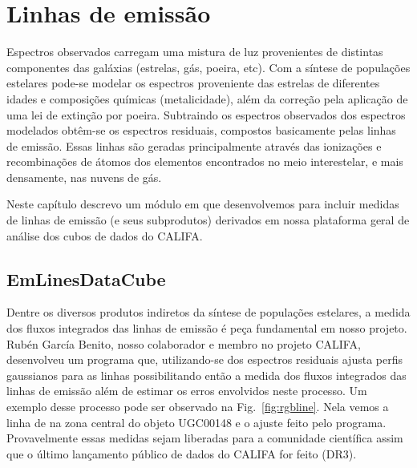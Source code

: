 


\chapter{Linhas de emissão}
\label{sec:emlines}

Espectros observados carregam uma mistura de luz provenientes de distintas componentes das galáxias (estrelas, gás, poeira, etc). Com a síntese de populações estelares pode-se modelar os espectros proveniente das estrelas de diferentes idades e composições químicas (metalicidade), além da correção pela aplicação de uma lei de extinção por poeira. Subtraindo os espectros observados dos espectros modelados obtêm-se os espectros residuais, compostos basicamente pelas linhas de emissão. Essas linhas são geradas principalmente através das ionizações e recombinações de átomos dos elementos encontrados no meio interestelar, e mais densamente, nas nuvens de gás.


Neste capítulo
descrevo um módulo em \pyt que desenvolvemos para incluir medidas de linhas de emissão (e seus
subprodutos) derivados em nossa plataforma geral de análise dos cubos de dados do CALIFA.

\section{EmLinesDataCube}
\label{sec:emline:datacube}

Dentre os diversos produtos indiretos da síntese de populações estelares, a medida dos fluxos integrados das linhas de emissão é peça fundamental em nosso projeto. Rubén García Benito, nosso colaborador e membro no projeto CALIFA, desenvolveu um programa que, utilizando-se dos espectros residuais ajusta perfis gaussianos para as linhas possibilitando então a medida dos fluxos integrados das linhas de emissão além de estimar os erros envolvidos neste processo. Um exemplo desse processo pode ser observado na Fig.\ \ref{fig:rgbline}. Nela vemos a linha de \Hbeta na zona central do objeto UGC00148 e o ajuste feito pelo programa. Provavelmente essas medidas sejam liberadas para a comunidade científica assim que o último lançamento público de dados do CALIFA for feito (DR3).

